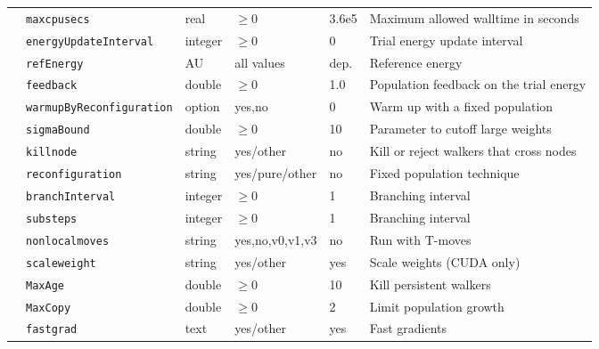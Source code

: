 \begin{table}[h]
\begin{center}
\begin{tabularx}{\textwidth}{l l l l l X }
   &   \texttt{maxcpusecs          } &  real  & $\ge 0$ & 3.6e5   & Maximum allowed walltime in seconds \\
   &   \texttt{energyUpdateInterval} &  integer  & $\ge 0$ & 0   & Trial energy update interval \\
   &   \texttt{refEnergy           } &  AU  & all values & dep.   & Reference energy  \\
   &   \texttt{feedback            } &  double  & $\ge 0$ & 1.0   & Population feedback on the trial energy \\
   &   \texttt{warmupByReconfiguration} &  option  & yes,no & 0   & Warm up with a fixed population  \\
   &   \texttt{sigmaBound          } &  double  & $\ge 0$  & 10   & Parameter to cutoff large weights  \\
   &   \texttt{killnode            } &  string  & yes/other & no   & Kill or reject walkers that cross nodes  \\
   &   \texttt{reconfiguration     } &  string  & yes/pure/other & no   & Fixed population technique  \\
   &   \texttt{branchInterval      } &  integer  & $\ge 0$ & 1   & Branching interval \\
   &   \texttt{substeps            } &  integer  & $\ge 0$ & 1   & Branching interval \\
   &   \texttt{nonlocalmoves       } &  string  & yes,no,v0,v1,v3 & no   & Run with T-moves  \\
   &   \texttt{scaleweight         } &  string  & yes/other & yes   & Scale weights (CUDA only)  \\
   &   \texttt{MaxAge              } &  double  & $\ge 0$ & 10   & Kill persistent walkers  \\
    &   \texttt{MaxCopy             } &  double  & $\ge 0$ &2   & Limit population growth \\
   &   \texttt{fastgrad            } &  text  & yes/other & yes   & Fast gradients  \\

\end{tabularx}
\end{center}
\end{table}
